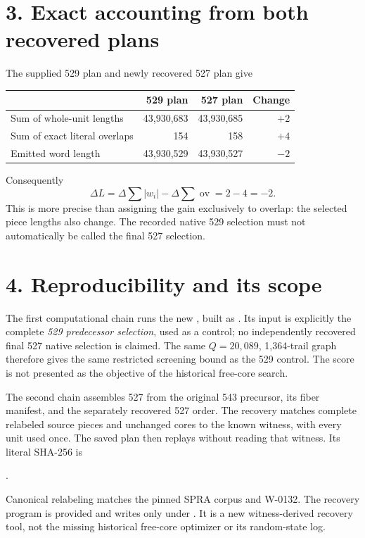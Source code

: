 \documentclass[11pt]{article}
\begin{document}
\newpage
\section*{3. Exact accounting from both recovered plans}
The supplied 529 plan and newly recovered 527 plan give
\begin{center}
\begin{tabular}{lrrr}\toprule
 &529 plan&527 plan&Change\\\midrule
Sum of whole-unit lengths&43,930,683&43,930,685&$+2$\\
Sum of exact literal overlaps&154&158&$+4$\\\midrule
Emitted word length&43,930,529&43,930,527&$-2$\\\bottomrule
\end{tabular}\end{center}
Consequently
\[
\boxed{\Delta L=\Delta\!\sum |w_i|-\Delta\!\sum\operatorname{ov}=2-4=-2.}
\]
This is more precise than assigning the gain exclusively to overlap:
the selected piece lengths also change. The recorded native 529 selection
must not automatically be called the final 527 selection.

\section*{4. Reproducibility and its scope}
The first computational chain runs the new , built
as . Its input is explicitly the complete \emph{529
predecessor selection}, used as a control; no independently recovered final
527 native selection is claimed. The same $Q=20{,}089$, 1,364-trail graph
therefore gives the same restricted screening bound as the 529 control.
The score is not presented as the objective of the historical free-core search.

The second chain assembles 527 from the original 543 precursor, its fiber
manifest, and the separately recovered 527 order. The recovery matches
complete relabeled source pieces and unchanged cores to the known witness,
with every unit used once. The saved plan then replays without reading that
witness. Its literal SHA-256 is
\begin{center}\small
{}.
\end{center}
Canonical relabeling matches the pinned SPRA corpus and W-0132.
The recovery program is provided and writes only under .
It is a new witness-derived recovery tool, not the missing historical
free-core optimizer or its random-state log.
\end{document}
